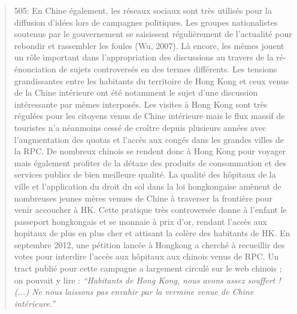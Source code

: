 \begin{quote}
\begin{description}
505: En Chine \'egalement, les r\'eseaux sociaux sont tr\`es utilis\'es pour la diffusion d{\textquoteright}id\'ees lors de campagnes politiques. Les groupes nationalistes soutenus par le gouvernement se saisissent r\'eguli\`erement de l{\textquoteright}actualit\'e pour rebondir et rassembler les foules (Wu, 2007). L\`a encore, les m\`emes jouent un r\^ole important dans l{\textquoteright}appropriation des discussions au travers de la r\'e-\'enonciation de sujets controvers\'es en des termes diff\'erents. Les tensions grandissantes entre les habitants du territoire de Hong Kong et ceux venus de la Chine int\'erieure ont \'et\'e notamment le sujet d{\textquoteright}une discussion int\'eressante par m\`emes interpos\'es. Les visites \`a Hong Kong sont tr\`es r\'egul\'ees pour les citoyens venus de Chine int\'erieure mais le flux massif de touristes n{\textquoteright}a n\'eanmoins cess\'e de cro\^itre depuis plusieurs ann\'ees avec l{\textquoteright}augmentation des quotas et l{\textquoteright}acc\`es aux cong\'es dans les grandes villes de la RPC. De nombreux chinois se rendent donc \`a Hong Kong pour voyager mais \'egalement profiter de la d\'etaxe des produits de consommation et des services publics de bien meilleure qualit\'e. La qualit\'e des h\^opitaux de la ville et l{\textquoteright}application du droit du sol dans la loi hongkongaise am\`enent de nombreuses jeunes m\`eres venues de Chine \`a traverser la fronti\`ere pour venir accoucher \`a HK. Cette pratique tr\`es controvers\'ee donne \`a l{\textquoteright}enfant le passeport hongkongais et se monnaie \`a prix d{\textquoteright}or, rendant l{\textquoteright}acc\`es aux hopitaux de plus en plus cher et attisant la col\`ere des habitants de HK. En septembre 2012, une p\'etition lanc\'ee \`a Hongkong a cherch\'e \`a recueillir des votes pour interdire l{\textquoteright}acc\`es aux h\^opitaux aux chinois venus de RPC. Un tract publi\'e pour cette campagne a largement circul\'e sur le web chinois ; on pouvait y lire :\textit{ {\textquotedblleft}Habitants de Hong Kong, nous avons assez souffert ! (...) Ne nous laissons pas envahir par la vermine venue de Chine int\'erieure.{\textquotedblright}}  

\end{description}
\end{quote}
